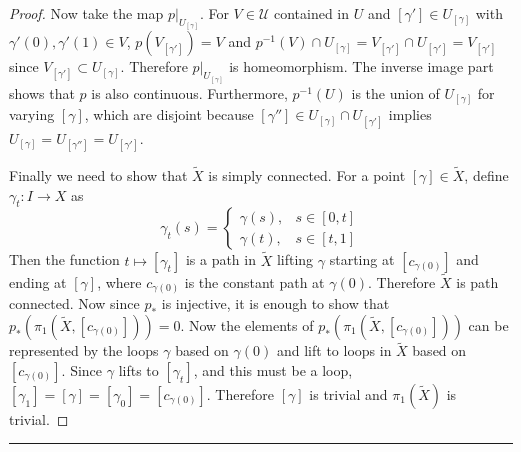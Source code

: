 \begin{proof}
Now take the map $p|_{U_{[\gamma]}}$. For $V\in \mathcal{U}$ contained in $U$ and $[\gamma']\in U_{[\gamma]}$ with $\gamma'(0),\gamma'(1)\in V$, $p(V_{[\gamma']})=V$ and $p^{-1}(V)\cap U_{[\gamma]}=V_{[\gamma']}\cap U_{[\gamma']}=V_{[\gamma']}$ since $V_{[\gamma']}\subset U_{[\gamma]}$. Therefore $p|_{U_{[\gamma]}}$ is homeomorphism. The inverse image part shows that $p$ is also continuous. Furthermore, $p^{-1}(U)$ is the union of $U_{[\gamma]}$ for varying $[\gamma]$, which are disjoint because $[\gamma'']\in U_{[\gamma]}\cap U_{[\gamma']}$ implies $U_{[\gamma]}=U_{[\gamma'']}=U_{[\gamma']}$.

Finally we need to show that $\tilde{X}$ is simply connected. For a point $[\gamma]\in \tilde{X}$, define $\gamma_t:I\rightarrow X$ as
\begin{equation}
\gamma_t(s)=\begin{cases}
\gamma(s),& s\in [0,t]\\
\gamma(t),&s\in [t,1]
\end{cases}
\end{equation}
Then the function $t\mapsto [\gamma_t]$ is a path in $\tilde{X}$ lifting $\gamma$ starting at $[c_{\gamma(0)}]$ and ending at $[\gamma]$, where $c_{\gamma(0)}$ is the constant path at $\gamma(0)$. Therefore $\tilde{X}$ is path connected. Now since $p_*$ is injective, it is enough to show that $p_*(\pi_1(\tilde{X},[c_{\gamma(0)}]))=0$. Now the elements of $p_*(\pi_1(\tilde{X},[c_{\gamma(0)}]))$ can be represented by the loops $\gamma$ based on $\gamma(0)$ and lift to loops in $\tilde{X}$ based on $[c_{\gamma(0)}]$. Since $\gamma$ lifts to $[\gamma_t]$, and this must be a loop, $[\gamma_1]=[\gamma]=[\gamma_0]=[c_{\gamma(0)}]$. Therefore $[\gamma]$ is trivial and $\pi_1(\tilde{X})$ is trivial.
\end{proof}
\noindent\rule{\textwidth}{1pt}
\newline